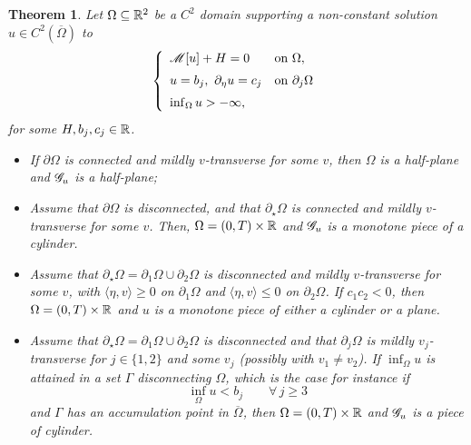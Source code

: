 \documentclass[10 pt,a4paper]{article}
\newtheorem{theorem}[definition]{Theorem}
\theoremstyle{definition}
\begin{document}
\begin{theorem}\label{teo_CMC_intro_R2}
	Let $\Omega \subseteq \mathbb R^2$ be a $C^2$ domain supporting a non-constant solution $u \in C^2(\overline\Omega)$ to 
	\[
		\left\{ 
		\begin{array}{ll}
			\mathscr{M}[u]  + H = 0 & \text{on } \Omega, \\[0.2cm]
			u = b_j, \ \partial_\eta u = c_j  & \text{on $\partial_j \Omega$} \\[0.2cm]
			\inf_\Omega u > -\infty,
		\end{array} \right.
	\]
	for some $H,b_j,c_j \in \mathbb R$.
	\begin{itemize}
		\item[(i)] If $\partial \Omega$ is connected and mildly $v$-transverse for some $v$, then $\Omega$ is a half-plane and $\mathscr{G}_u$ is a half-plane;
		\item[(ii)] Assume that $\partial \Omega$ is disconnected, and  that $\partial_\star \Omega$ is connected and mildly $v$-transverse for some $v$. Then, $\Omega = (0,T) \times \mathbb R$ and $\mathscr{G}_u$ is a monotone piece of a cylinder.
		\item[(iii)] Assume that $\partial_\star \Omega = \partial_1\Omega \cup \partial_2\Omega$ is disconnected and mildly $v$-transverse for some $v$, with $\langle \eta,v \rangle \ge 0$ on $\partial_1\Omega$ and $\langle \eta,v \rangle \le 0$ on $\partial_2\Omega$. If $c_1c_2<0$, then $\Omega = (0,T) \times \mathbb R$ and $u$ is a monotone piece of either a cylinder or a plane.
		\item[(iv)] Assume that $\partial_\star \Omega = \partial_1\Omega \cup \partial_2\Omega$ is disconnected and that $\partial_j \Omega$ is mildly $v_j$-transverse for $j \in \{1,2\}$ and some $v_j$ (possibly with $v_1 \neq v_2$). If $\inf_\Omega u$ is attained in a set $\Gamma$ disconnecting $\Omega$, which is the case for instance if  
		\[
		\inf_\Omega u < b_j \qquad \forall \, j \ge 3 
		\]
		and $\Gamma$ has an accumulation point in $\overline{\Omega}$, then $\Omega=(0,T) \times \mathbb R$ and $\mathscr{G}_u$ is a piece of cylinder.
	\end{itemize}
\end{theorem}
\end{document}
